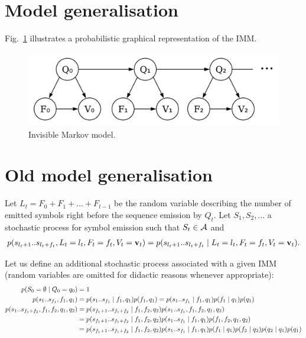 \section{Model generalisation}

Fig.~\ref{fig:imm} illustrates a probabilistic graphical representation of the IMM.

\begin{figure}[htbp]
\centering
\includegraphics[width=.45\linewidth]{imm}
\caption{Invisible Markov model.}%
\label{fig:imm}
\end{figure}


\newpage
\newpage

\section{Old model generalisation}

Let $L_t=F_0+F_1+\dots + F_{t-1}$ be the random variable describing the number of emitted symbols right
before the sequence emission by $Q_t$.
Let $S_1, S_2, \dots$ a stochastic process for symbol emission such that $S_t\in\mathcal{A}$
and
\begin{align*}
    p(s_{l_t+1} .. s_{l_t+f_t}, L_t=l_t, F_t=f_t, V_t=\mathbf v_t)
        = p(s_{l_t+1} .. s_{l_t+f_t}\;|\; L_t=l_t, F_t=f_t, V_t=\mathbf v_t).
\end{align*}

Let us define an additional stochastic process  associated with a given IMM
(random variables are omitted for didactic reasons whenever appropriate):
\begin{align*}
    p(S_0=\emptyset\;|\; Q_0=q_0)
        &=1\\
    p(s_1 .. s_{f_1},f_1,q_1)
        &= p(s_1 .. s_{f_1}\;|\; f_1,q_1)p(f_1,q_1) = p(s_1 .. s_{f_1}\;|\; f_1,q_1)p(f_1\;|\; q_1)p(q_1)\\
    p(s_1 .. s_{f_1+f_2},f_1,f_2,q_1,q_2)
        &= p(s_{f_1+1} .. s_{f_1+f_2}\;|\; f_1, f_2, q_2)p(s_1 .. s_{f_1}, f_1, f_2, q_1, q_2)\\
        &= p(s_{f_1+1} .. s_{f_1+f_2}\;|\; f_1, f_2, q_2)p(s_1 .. s_{f_1}\;|\; f_1, q_1) p(f_1, f_2, q_1, q_2)\\
        &= p(s_{f_1+1} .. s_{f_1+f_2}\;|\; f_1, f_2, q_2)p(s_1 .. s_{f_1}\;|\; f_1, q_1) p(f_1\;|\; q_1) p(f_2\;|\; q_2)p(q_2\;|\; q_1)p(q_1)
\end{align*}

